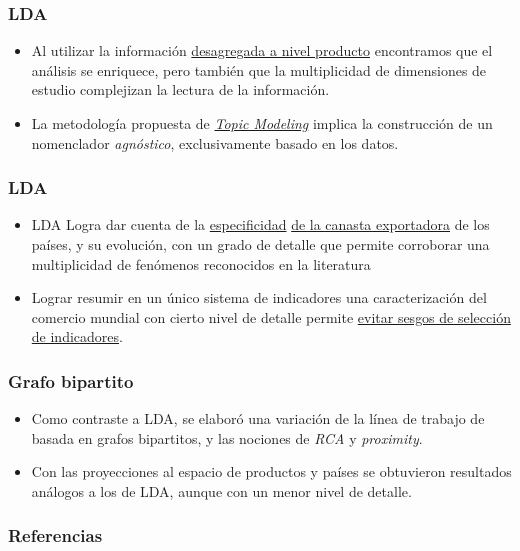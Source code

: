 \documentclass[compress]{beamer}
\begin{document}
\begin{frame}
\frametitle{LDA}
\begin{itemize}[label=\faRebel]
	\item Al utilizar la información \underline{desagregada a nivel producto} encontramos que el análisis se enriquece, pero también que la multiplicidad de dimensiones de estudio complejizan la lectura de la información. 
	\item La metodología propuesta de \underline{\textit{Topic Modeling}} implica la construcción de un nomenclador \textit{agnóstico}, exclusivamente basado en los datos.
\end{itemize}
\end{frame}

\begin{frame}
\frametitle{LDA}
\begin{itemize}[label=\faRebel]

	\item LDA Logra dar cuenta de la \underline{especificidad} \underline{de la canasta exportadora} de los países, y su evolución, con un grado de detalle que permite corroborar una multiplicidad de fenómenos reconocidos en la literatura
	\item Lograr resumir en un único sistema de indicadores una caracterización del comercio mundial con cierto nivel de detalle permite \underline{evitar sesgos de selección de indicadores}.
\end{itemize}
\end{frame}

\begin{frame}
\frametitle{Grafo bipartito}
\begin{itemize}[label=\faRebel]
	\item Como contraste a LDA, se elaboró una variación de la línea de trabajo de \cite{Hidalgo2007} basada en grafos bipartitos, y las nociones de  \textit{RCA} y \textit{proximity}. 
	\item Con las proyecciones al espacio de productos y países se obtuvieron resultados análogos a los de LDA, aunque con un menor nivel de detalle.
\end{itemize}
\end{frame}

\begin{frame}
	\frametitle{Referencias}

	\tiny

	
\end{frame}
\end{document}
